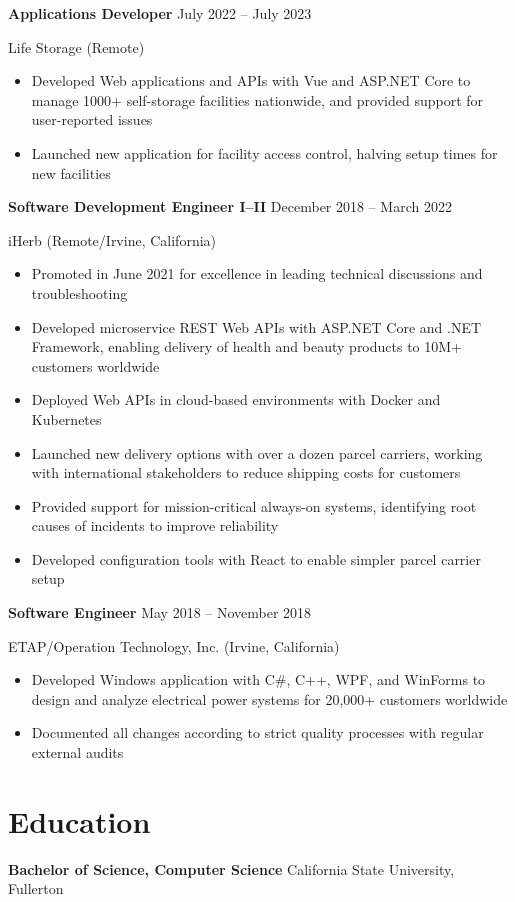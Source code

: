 \documentclass[12pt]{article}
\newcommand{\titleheader}[2]{\textbf{#1} \symbol{"B7} #2}
\newcommand{\locheader}[2]{#1 (#2)}
\begin{document}
	\titleheader{Applications Developer}{July 2022 -- July 2023}

	\locheader{Life Storage}{Remote}

	\begin{itemize}
		\item Developed Web applications and APIs with Vue and ASP.NET Core to manage 1000+ self-storage facilities nationwide, and provided support for user-reported issues
		\item Launched new application for facility access control, halving setup times for new facilities
	\end{itemize}

	\titleheader{Software Development Engineer I--II}{December 2018 -- March 2022}

	\locheader{iHerb}{Remote/Irvine, California}

	\begin{itemize}
		\item Promoted in June 2021 for excellence in leading technical discussions and troubleshooting
		\item Developed microservice REST Web APIs with ASP.NET Core and .NET Framework, enabling delivery of health and beauty products to 10M+ customers worldwide
		\item Deployed Web APIs in cloud-based environments with Docker and Kubernetes
		\item Launched new delivery options with over a dozen parcel carriers, working with international stakeholders to reduce shipping costs for customers
		\item Provided support for mission-critical always-on systems, identifying root causes of incidents to improve reliability
		\item Developed configuration tools with React to enable simpler parcel carrier setup
	\end{itemize}

	\titleheader{Software Engineer}{May 2018 -- November 2018}

	\locheader{ETAP/Operation Technology, Inc.}{Irvine, California}

	\begin{itemize}
		\item Developed Windows application with C\#, C++, WPF, and WinForms to design and analyze electrical power systems for 20,000+ customers worldwide
		\item Documented all changes according to strict quality processes with regular external audits
	\end{itemize}

	\section*{Education}

	\textbf{Bachelor of Science, Computer Science}  California State University, Fullerton
\end{document}
